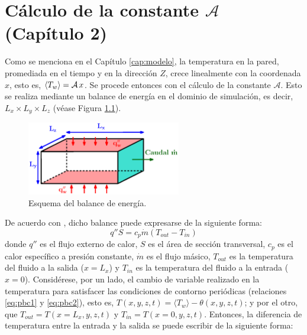 \chapter{Cálculo de la constante $\mathcal{A}$ (Capítulo 2)} \label{apen:constante-A}

Como se menciona en el Capítulo \ref{cap:modelo}, la temperatura en la pared, promediada en el tiempo y en la dirección $Z$, crece linealmente con la coordenada $x$, esto es, $\langle T_w \rangle = \mathcal{A} \hspace{0.5mm} x $. Se procede entonces con el cálculo de la constante $\mathcal{A}$. Esto se realiza mediante un balance de energía en el dominio de simulación, es decir, $L_x \times L_y \times L_z$ (véase Figura \ref{fig:apendice-b}). 

\begin{figure}[H]
  \centering  
    \includegraphics[width=0.6\textwidth]{figures/apendices/apendice_b.eps}
  \caption{Esquema del balance de energía.}
  \label{fig:apendice-b}
\end{figure}
De acuerdo con \cite{cengelheat}, dicho balance puede expresarse de la siguiente forma:
$$ q'' S = c_p \dot{m} \left( T_{out} - T_{in} \right)$$
donde $q''$ es el flujo externo de calor, $S$ es el área de sección transversal, $c_p$ es el calor específico a presión constante, $\dot{m}$ es el flujo másico, $T_{out}$ es la temperatura del fluido a la salida ($x=L_x$) y $T_{in}$ es la temperatura del fluido a la entrada ($x=0$). Considérese, por un lado, el cambio de variable realizado en la temperatura para satisfacer las condiciones de contorno periódicas (relaciones \ref{eq:pbc1} y \ref{eq:pbc2}), esto es, $T(x,y,z,t)= \langle T_w \rangle - \theta(x,y,z,t)$; y por el otro, que $T_{out}=T(x=L_x,y,z,t)$ y $T_{in}=T(x=0,y,z,t)$. Entonces, la diferencia de temperatura entre la entrada y la salida se puede escribir de la siguiente forma:

